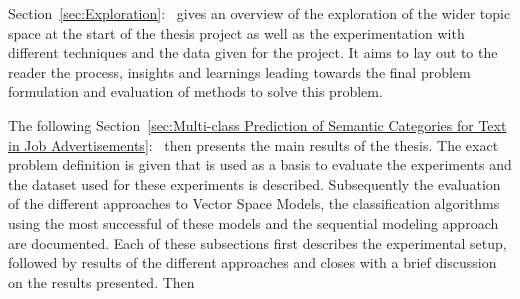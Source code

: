 Section~\ref{sec:Exploration}:~ gives an overview of the exploration of the wider topic space at the start of the thesis project as well as the experimentation with different techniques and the data given for the project. It aims to lay out to the reader the process, insights and learnings leading towards the final problem formulation and evaluation of methods to solve this problem.

The following Section~\ref{sec:Multi-class Prediction of Semantic Categories for Text in Job Advertisements}:~ then presents the main results of the thesis. The exact problem definition is given that is used as a basis to evaluate the experiments and the dataset used for these experiments is described. Subsequently the evaluation of the different approaches to Vector Space Models, the classification algorithms using the most successful of these models and the sequential modeling approach are documented. Each of these subsections first describes the experimental setup, followed by results of the different approaches and closes with a brief discussion on the results presented. Then
